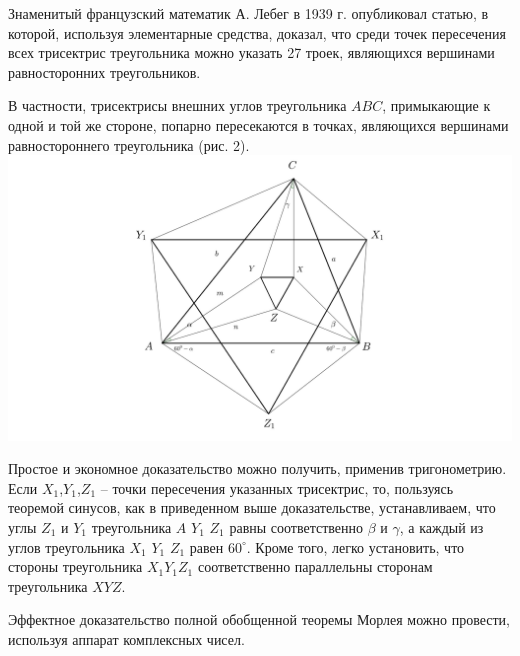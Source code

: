 \documentclass{article}
\begin{document}
\par Знаменитый французский математик А. Лебег в 1939 г. опубликовал статью, в которой, используя элементарные средства, доказал, что среди точек пересечения всех трисектрис треугольника можно указать 27 троек, являющихся вершинами равносторонних треугольников. 
\par В частности, трисектрисы внешних углов треугольника $ABC$, примыкающие к одной и той же стороне, попарно пересекаются в точках, являющихся вершинами равностороннего треугольника (рис. 2).
\\
\includegraphics[scale=0.25]{morley2.png}
\par Простое и экономное доказательство можно получить, применив тригонометрию. Если $X_1$,$Y_1$,$Z_1$ -- точки пересечения указанных трисектрис, то, пользуясь теоремой синусов, как в приведенном выше доказательстве, устанавливаем, что углы $Z_1$ и $Y_1$ треугольника $A$ $Y_1$ $Z_1$ равны соответственно $\beta$ и $\gamma$, а каждый из углов треугольника $X_1$ $Y_1$ $Z_1$ равен $60^{\circ}$. Кроме того, легко установить, что стороны треугольника $X_1$$Y_1$$Z_1$ соответственно параллельны сторонам треугольника $XYZ$. 
\par Эффектное доказательство полной обобщенной теоремы Морлея можно провести, используя аппарат комплексных чисел.
\end{document}

